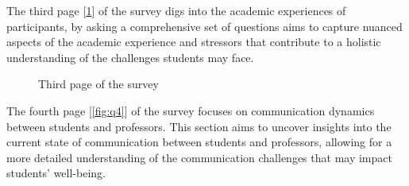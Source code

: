 \documentclass[11pt]{report}
\begin{document}
The third page [\ref{fig:q3}] of the survey digs into the academic experiences of participants, by asking a comprehensive set of questions aims to capture nuanced aspects of the academic experience and stressors that contribute to a holistic understanding of the challenges students may face.
\begin{figure}[h!]
    \centering
    \hfill
    \caption{Third page of the survey}
    \label{fig:q3}
\end{figure}
\FloatBarrier
\noindent The fourth page [\ref{fig:q4}] of the survey focuses on communication dynamics between students and professors. This section aims to uncover insights into the current state of communication between students and professors, allowing for a more detailed understanding of the communication challenges that may impact students' well-being.
\end{document}
